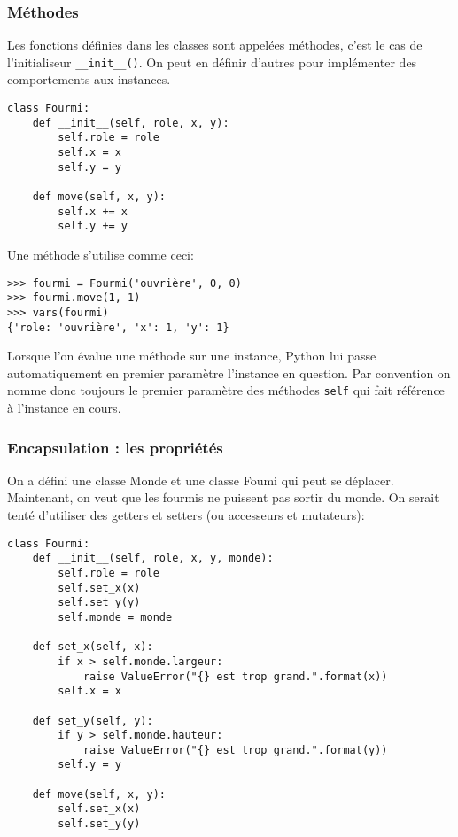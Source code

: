 \subsubsection{Méthodes}

Les fonctions définies dans les classes sont appelées méthodes, c'est le cas de l'initialiseur \texttt{__init__()}. On peut en définir d'autres pour implémenter des comportements aux instances.

\begin{verbatim}
class Fourmi:
    def __init__(self, role, x, y):
        self.role = role
        self.x = x
        self.y = y
    
    def move(self, x, y):
        self.x += x
        self.y += y
\end{verbatim}

Une méthode s'utilise comme ceci:

\begin{verbatim}
>>> fourmi = Fourmi('ouvrière', 0, 0)
>>> fourmi.move(1, 1)
>>> vars(fourmi)
{'role: 'ouvrière', 'x': 1, 'y': 1}
\end{verbatim}

Lorsque l'on évalue une méthode sur une instance, Python lui passe automatiquement en premier paramètre l'instance en question. Par convention on nomme donc toujours le premier paramètre des méthodes \texttt{self} qui fait référence à l'instance en cours.

\subsubsection{Encapsulation : les propriétés}

On a défini une classe Monde et une classe Foumi qui peut se déplacer. Maintenant, on veut que les fourmis ne puissent pas sortir du monde. On serait tenté d'utiliser des getters et setters (ou accesseurs et mutateurs):

\begin{verbatim}
class Fourmi:
    def __init__(self, role, x, y, monde):
        self.role = role
        self.set_x(x)
        self.set_y(y)
        self.monde = monde

    def set_x(self, x):
        if x > self.monde.largeur:
            raise ValueError("{} est trop grand.".format(x))
        self.x = x
    
    def set_y(self, y):
        if y > self.monde.hauteur:
            raise ValueError("{} est trop grand.".format(y))
        self.y = y

    def move(self, x, y):
        self.set_x(x)
        self.set_y(y)
\end{verbatim}

